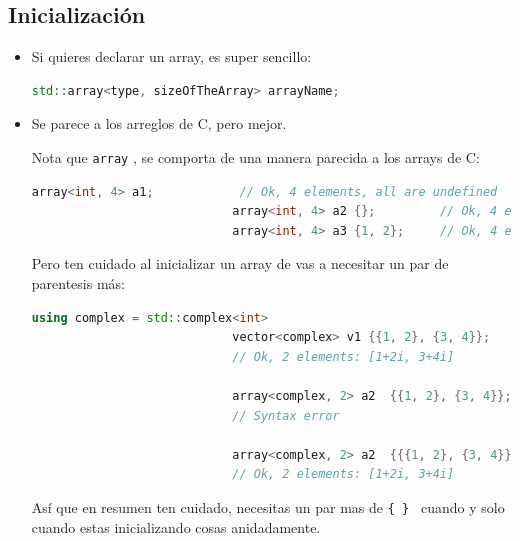\documentclass[12pt, fleqn]{report}                             %
\newcommand \Quote              {\qq}                           %
\theoremstyle{break}                                            %
\newcommand{\textCode}[1]  { \texttt{#1} }                      %
\begin{document}
            \subsection{Inicialización}

                \begin{itemize}
                    \item Si quieres declarar un array, es super sencillo:
                        \begin{lstlisting}[language=C++, gobble=28]
                            std::array<type, sizeOfTheArray> arrayName;
                        \end{lstlisting}

                    \item Se parece a los arreglos de C, pero mejor.
                        
                        Nota que \textCode{array}, se comporta de una manera parecida a los arrays de C:
                        \begin{lstlisting}[language=C++, gobble=28]
                            array<int, 4> a1;            // Ok, 4 elements, all are undefined
                            array<int, 4> a2 {};         // Ok, 4 elements: [0, 0, 0, 0]
                            array<int, 4> a3 {1, 2};     // Ok, 4 elements: [1, 2, 0, 0]
                        \end{lstlisting}

                        Pero ten cuidado al inicializar un array de \Quote{cosas} vas a necesitar 
                        un par de parentesis más:
                        \begin{lstlisting}[language=C++, gobble=28]
                            using complex = std::complex<int>
                            vector<complex> v1 {{1, 2}, {3, 4}};      
                            // Ok, 2 elements: [1+2i, 3+4i]
                            
                            array<complex, 2> a2  {{1, 2}, {3, 4}};
                            // Syntax error
                            
                            array<complex, 2> a2  {{{1, 2}, {3, 4}}};
                            // Ok, 2 elements: [1+2i, 3+4i]
                        \end{lstlisting}

                        Así que en resumen ten cuidado, necesitas un par mas de \textCode{\{ \} }
                        cuando y solo cuando estas inicializando cosas anidadamente.
                \end{itemize}
\end{document}
